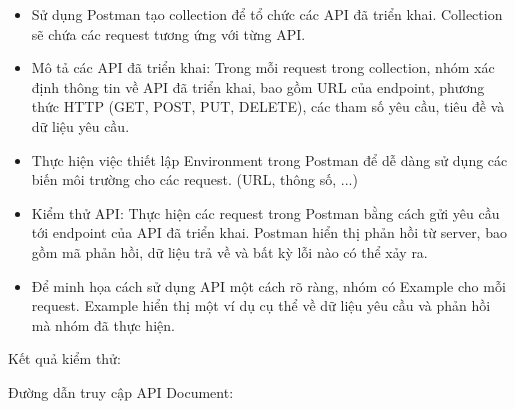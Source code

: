 \begin{itemize}
    \item Sử dụng Postman tạo collection để tổ chức các API đã triển khai. Collection sẽ chứa các request tương ứng với từng API.
    \item Mô tả các API đã triển khai: Trong mỗi request trong collection, nhóm xác định thông tin về API đã triển khai, bao gồm URL của endpoint, phương thức HTTP (GET, POST, PUT, DELETE), các tham số yêu cầu, tiêu đề và dữ liệu yêu cầu.
    \item  Thực hiện việc thiết lập Environment trong Postman
    để dễ dàng sử dụng các biến môi trường cho các request. (URL, thông số, ...)
    \item Kiểm thử API: Thực hiện các request trong Postman bằng cách gửi yêu cầu tới endpoint của API đã triển khai. Postman hiển thị phản hồi từ server, bao gồm mã phản hồi, dữ liệu trả về và bất kỳ lỗi nào có thể xảy ra.
    \item Để minh họa cách sử dụng API một cách rõ ràng, nhóm có Example cho mỗi request. Example hiển thị một ví dụ cụ thể về dữ liệu yêu cầu và phản hồi mà nhóm đã thực hiện.

\end{itemize}

Kết quả kiểm thử: 


Đường dẫn truy cập API Document: 
